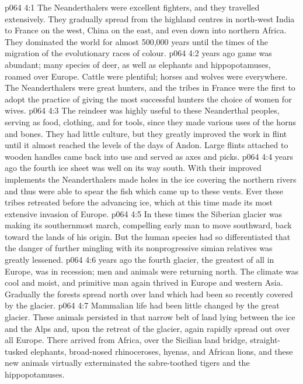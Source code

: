 \vs p064 4:1 The Neanderthalers were excellent fighters, and they travelled extensively. They gradually spread from the highland centres in north\hyp{}west India to France on the west, China on the east, and even down into northern Africa. They dominated the world for almost 500,000 years until the times of the migration of the evolutionary races of colour.
\vs p064 4:2 \pc {} years ago game was abundant; many species of deer, as well as elephants and hippopotamuses, roamed over Europe. Cattle were plentiful; horses and wolves were everywhere. The Neanderthalers were great hunters, and the tribes in France were the first to adopt the practice of giving the most successful hunters the choice of women for wives.
\vs p064 4:3 The reindeer was highly useful to these Neanderthal peoples, serving as food, clothing, and for tools, since they made various uses of the horns and bones. They had little culture, but they greatly improved the work in flint until it almost reached the levels of the days of Andon. Large flints attached to wooden handles came back into use and served as axes and picks.
\vs p064 4:4 \pc {} years ago the fourth ice sheet was well on its way south. With their improved implements the Neanderthalers made holes in the ice covering the northern rivers and thus were able to spear the fish which came up to these vents. Ever these tribes retreated before the advancing ice, which at this time made its most extensive invasion of Europe.
\vs p064 4:5 In these times the Siberian glacier was making its southernmost march, compelling early man to move southward, back toward the lands of his origin. But the human species had so differentiated that the danger of further mingling with its nonprogressive simian relatives was greatly lessened.
\vs p064 4:6 \pc {} years ago the fourth glacier, the greatest of all in Europe, was in recession; men and animals were returning north. The climate was cool and moist, and primitive man again thrived in Europe and western Asia. Gradually the forests spread north over land which had been so recently covered by the glacier.
\vs p064 4:7 Mammalian life had been little changed by the great glacier. These animals persisted in that narrow belt of land lying between the ice and the Alps and, upon the retreat of the glacier, again rapidly spread out over all Europe. There arrived from Africa, over the Sicilian land bridge, straight\hyp{}tusked elephants, broad\hyp{}nosed rhinoceroses, hyenas, and African lions, and these new animals virtually exterminated the sabre\hyp{}toothed tigers and the hippopotamuses.

